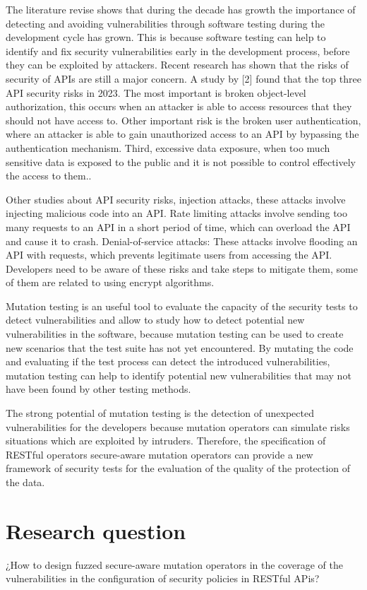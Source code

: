 The literature revise shows that during the decade has growth the importance of detecting and avoiding vulnerabilities through software testing\cite{8564344} during the development cycle has grown.  This is because software testing can help to identify and fix security vulnerabilities early in the development process, before they can be exploited by attackers. Recent research has shown that the risks of security of APIs are still a major concern. A study by [2] found that the top three API security risks in 2023. The most important is broken object-level authorization, this occurs when an attacker is able to access resources that they should not have access to. Other important risk is the broken user authentication, where an attacker is able to gain unauthorized access to an API by bypassing the authentication mechanism. Third, excessive data exposure, when too much sensitive data is exposed to the public and it is not possible to control effectively the access to them..

Other studies about API security risks\cite{zenodo}, injection attacks, these attacks involve injecting malicious code into an API. Rate limiting attacks involve sending too many requests to an API in a short period of time, which can overload the API and cause it to crash. Denial-of-service attacks: These attacks involve flooding an API with requests, which prevents legitimate users from accessing the API. Developers need to be aware of these risks and take steps to mitigate them, some of them are related to using encrypt algorithms.

Mutation testing is an useful tool to evaluate the capacity of the security tests to detect vulnerabilities and allow to study how to detect potential new vulnerabilities in the software, because mutation testing can be used to create new scenarios that the test suite has not yet encountered. By mutating the code and evaluating if the test process can detect the introduced vulnerabilities, mutation testing can help to identify potential new vulnerabilities that may not have been found by other testing methods.

The strong potential of mutation testing is the detection of unexpected vulnerabilities for the developers because mutation operators can simulate risks situations which are exploited by intruders. Therefore, the specification of RESTful operators secure-aware mutation operators can provide a new framework of security tests for the evaluation of the quality of the protection of the data.

\section{Research question}

¿How to design fuzzed secure-aware mutation operators in the coverage of the vulnerabilities in the configuration of security policies in RESTful APis?
